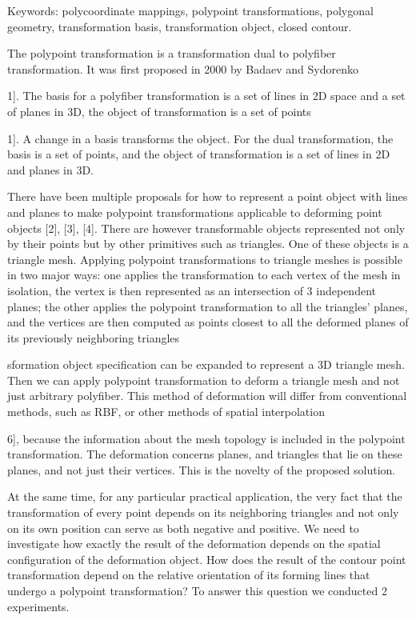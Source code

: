 \documentclass[12pt,a4paper]{article}
\begin{document}
\par
Keywords: polycoordinate mappings, polypoint transformations, polygonal geometry, transformation basis, transformation object, closed contour.
\par
The polypoint transformation is a transformation dual to polyfiber transformation. It was first proposed in 2000 by Badaev and Sydorenko
\par
1]. The basis for a polyfiber transformation is a set of lines in 2D space and a set of planes in 3D, the object of transformation is a set of points
\par
1]. A change in a basis transforms the object. For the dual transformation, the basis is a set of points, and the object of transformation is a set of lines in 2D and planes in 3D.
\par
There have been multiple proposals for how to represent a point object with lines and planes to make polypoint transformations applicable to deforming point objects [2], [3], [4]. There are however transformable objects represented not only by their points but by other primitives such as triangles. One of these objects is a triangle mesh. Applying polypoint transformations to triangle meshes is possible in two major ways: one applies the transformation to each vertex of the mesh in isolation, the vertex is then represented as an intersection of 3 independent planes; the other applies the polypoint transformation to all the triangles’ planes, and the vertices are then computed as points closest to all the deformed planes of its previously neighboring triangles
\par
sformation object specification can be expanded to represent a 3D triangle mesh. Then we can apply polypoint transformation to deform a triangle mesh and not just arbitrary polyfiber. This method of deformation will differ from conventional methods, such as RBF, or other methods of spatial interpolation
\par
6], because the information about the mesh topology is included in the polypoint transformation. The deformation concerns planes, and triangles that lie on these planes, and not just their vertices. This is the novelty of the proposed solution.
\par
At the same time, for any particular practical application, the very fact that the transformation of every point depends on its neighboring triangles and not only on its own position can serve as both negative and positive. We need to investigate how exactly the result of the deformation depends on the spatial configuration of the deformation object. How does the result of the contour point transformation depend on the relative orientation of its forming lines that undergo a polypoint transformation? To answer this question we conducted 2 experiments.
\end{document}
